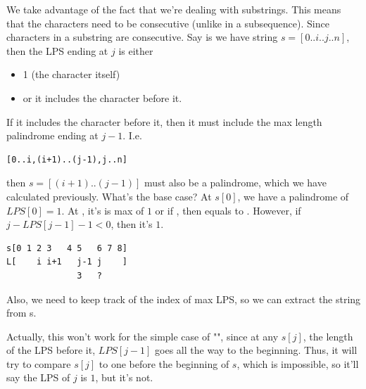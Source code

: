 \qasepline{}

We take advantage of the fact that we're dealing with substrings. This means
that the characters need to be consecutive (unlike in a subsequence).  Since
characters in a substring are consecutive. Say is we have string
$s=[0..i..j..n]$, then the LPS ending at $j$ is either
\begin{itemize}%
\item 1 (the character itself)
\item or it includes the character before it.
\end{itemize}
If it includes the character before it, then it must include the max length
palindrome ending at $j-1$. I.e.
\begin{lstlisting}[style=raygeneric]
[0..i,(i+1)..(j-1),j..n]
\end{lstlisting}
then $s=[(i+1)..(j-1)]$ must also be a palindrome, which we have calculated
previously. What's the base case? At $s[0]$, we have a palindrome of
$LPS[0]=1$. At
, it's  is max of $1$ or if , then equals to . However, if $j-LPS[j-1]-1<0$, then
it's $1$.
\begin{lstlisting}[style=raygeneric]
s[0 1 2 3   4 5   6 7 8]
L[    i i+1   j-1 j    ]
              3   ?
\end{lstlisting}
Also, we need to keep track of the index of max LPS, so we can extract the
string from s.

Actually, this won't work for the simple case of "", since
at any $s[j]$, the length of the LPS before it, $LPS[j-1]$ goes all the way
to the beginning. Thus, it will try to compare $s[j]$ to one before the
beginning of $s$, which is impossible, so it'll say the LPS of $j$ is $1$,
but it's not.

\qasepline{}

